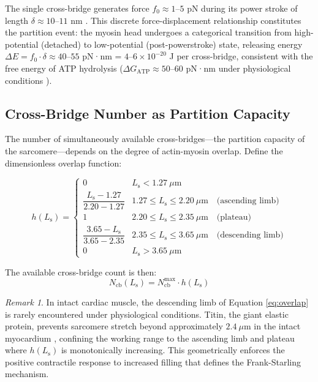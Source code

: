 \documentclass[10pt,twocolumn,a4paper]{article}
\theoremstyle{remark}
\newtheorem{remark}[theorem]{Remark}
\newcommand{\Ncb}{N_{\mathrm{cb}}}
\newcommand{\Ls}{L_{\mathrm{s}}}
\begin{document}
The single cross-bridge generates force $f_0 \approx 1$--$5$ pN during its power stroke of length $\delta \approx 10$--$11$ nm \cite{finer1994single}. This discrete force-displacement relationship constitutes the partition event: the myosin head undergoes a categorical transition from high-potential (detached) to low-potential (post-powerstroke) state, releasing energy $\Delta E = f_0 \cdot \delta \approx 40$--$55$ pN·nm = $4$--$6 \times 10^{-20}$ J per cross-bridge, consistent with the free energy of ATP hydrolysis ($\Delta G_{\mathrm{ATP}} \approx 50$--$60$ pN·nm under physiological conditions \cite{kushmerick1992chemical}).

\subsection{Cross-Bridge Number as Partition Capacity}

The number of simultaneously available cross-bridges—the partition capacity of the sarcomere—depends on the degree of actin-myosin overlap. Define the dimensionless overlap function:

\begin{equation}
    h(\Ls) = \begin{cases}
        0 & \Ls < 1.27~\mu\mathrm{m} \\[4pt]
        \dfrac{\Ls - 1.27}{2.20 - 1.27} & 1.27 \leq \Ls \leq 2.20~\mu\mathrm{m} \quad \text{(ascending limb)} \\[8pt]
        1 & 2.20 \leq \Ls \leq 2.35~\mu\mathrm{m} \quad \text{(plateau)} \\[4pt]
        \dfrac{3.65 - \Ls}{3.65 - 2.35} & 2.35 \leq \Ls \leq 3.65~\mu\mathrm{m} \quad \text{(descending limb)} \\[4pt]
        0 & \Ls > 3.65~\mu\mathrm{m}
    \end{cases}
    \label{eq:overlap}
\end{equation}

The available cross-bridge count is then:
\begin{equation}
    \Ncb(\Ls) = \Ncb^{\max} \cdot h(\Ls)
    \label{eq:Ncb}
\end{equation}

\begin{remark}
    In intact cardiac muscle, the descending limb of Equation \ref{eq:overlap} is rarely encountered under physiological conditions. Titin, the giant elastic protein, prevents sarcomere stretch beyond approximately $2.4~\mu\mathrm{m}$ in the intact myocardium \cite{granzier2002giant}, confining the working range to the ascending limb and plateau where $h(\Ls)$ is monotonically increasing. This geometrically enforces the positive contractile response to increased filling that defines the Frank-Starling mechanism.
\end{remark}
\end{document}
